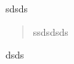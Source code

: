 \documentclass[12pt]{book}
\begin{document}
sdsds
\begin{quote}
ssdsdsds
\end{quote}
dsds
\end{document}
